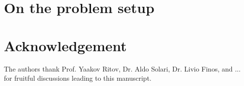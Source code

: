 \documentclass[article,lineno]{biometrika}
\begin{document}
\section{On the problem setup}



\section*{Acknowledgement}
The authors thank Prof. Yaakov Ritov, Dr. Aldo Solari, Dr. Livio Finos, and ... for fruitful discussions leading to this manuscript. 






\end{document}
